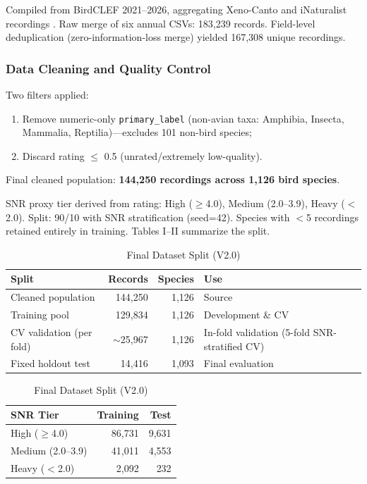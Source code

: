 \documentclass[conference]{IEEEtran}
\begin{document}
Compiled from BirdCLEF 2021--2026, aggregating Xeno-Canto and iNaturalist recordings \cite{birdclef, xenocanto}. Raw merge of six annual CSVs: 183,239 records. Field-level deduplication (zero-information-loss merge) yielded 167,308 unique recordings.

\subsubsection{Data Cleaning and Quality Control}

Two filters applied:
\begin{enumerate}
    \item Remove numeric-only \texttt{primary\_label} (non-avian taxa: Amphibia, Insecta, Mammalia, Reptilia)—excludes 101 non-bird species;
    \item Discard rating $\leq$ 0.5 (unrated/extremely low-quality).
\end{enumerate}
Final cleaned population: \textbf{144,250 recordings across 1,126 bird species}.

SNR proxy tier derived from rating: High ($\geq$4.0), Medium (2.0--3.9), Heavy ($<$2.0). Split: 90/10 with SNR stratification (seed=42). Species with $<$5 recordings retained entirely in training. Tables I--II summarize the split.

\begin{table}[!t]
\centering
\caption{Final Dataset Split (V2.0)}
\label{tab:split}
\begin{tabular*}{\columnwidth}{@{\extracolsep{\fill}}lrrl}
\toprule
\textbf{Split} & \textbf{Records} & \textbf{Species} & \textbf{Use} \\
\midrule
Cleaned population & 144,250 & 1,126 & Source \\
Training pool & 129,834 & 1,126 & Development \& CV \\
CV validation (per fold) & $\sim$25,967 & 1,126 & In-fold validation (5-fold SNR-stratified CV) \\
Fixed holdout test & 14,416 & 1,093 & Final evaluation \\
\bottomrule
\end{tabular*}

\vspace{2\baselineskip}

\label{tab:snr}
\begin{tabular}{lrr}
\toprule
\textbf{SNR Tier} & \textbf{Training} & \textbf{Test} \\
\midrule
High ($\geq$4.0) & 86,731 & 9,631 \\
Medium (2.0--3.9) & 41,011 & 4,553 \\
Heavy ($<$2.0) & 2,092 & 232 \\
\bottomrule
\end{tabular}
\end{table}
\end{document}
